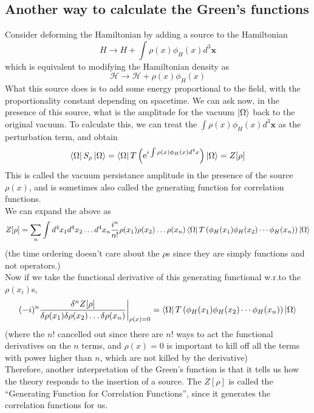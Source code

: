 \documentclass[11pt, notitlepage]{report}
\newcommand{\e}{\mathrm{e}}
\newcommand{\hd}{\mathcal{H}}
\numberwithin{equation}{section}
\begin{document}
\subsection{Another way to calculate the Green's functions}
Consider deforming the Hamiltonian by adding a source to the Hamiltonian 
\begin{equation*}
    H \to H + \int \rho(x) \phi_H(x) d^3\textbf{x}
\end{equation*}
which is equivalent to modifying the Hamiltonian density as 
\begin{equation*}
    \hd \to \hd + \rho(x) \phi_H(x)
\end{equation*}
What this source does is to add some energy proportional to the field, with the proportionality constant depending on spacetime. We can ask now, in the presence of this source, what is the amplitude for the vacuum \(\ket{\Omega}\) back to the original vacuum. To calculate this, we can treat the \(\int \rho(x)\phi_H(x)d^3\textbf{x}\) as the perturbation term, and obtain 
\begin{equation*}
    \bra{\Omega}S_\rho \ket{\Omega} = \bra{\Omega} T\left(\e^{i\int \rho(x)\phi_H(x)d^4x} \right) \ket{\Omega}  = Z[\rho]
\end{equation*}
This is called the vacuum persistance amplitude in the presence of the source \(\rho(x)\), and is sometimes also called the generating function for correlation functions.\\
We can expand the above as 
\begin{equation*}
    Z[\rho] = \sum_n \int d^4x_1 d^4x_2 \ldots d^4x_n \frac{i^n}{n!} \rho(x_1)\rho(x_2)\ldots\rho(x_n)\bra{\Omega} T\left(  \phi_H(x_1)\phi_H(x_2)\cdots \phi_H(x_n) \right) \ket{\Omega}
\end{equation*}
(the time ordering doesn't care about the \(\rho\)s since they are simply functions and not operators.)\\

Now if we take the functional derivative of this generating functional w.r.to the \(\rho(x_i)\)s, 
\begin{equation*}
    (-i)^n\frac{\delta^n Z[\rho]}{\delta \rho(x_1)\delta \rho(x_2) \ldots {\delta \rho(x_n)}} \bigg|_{\rho(x) = 0}= \bra{\Omega} T\left(  \phi_H(x_1)\phi_H(x_2)\cdots \phi_H(x_n) \right) \ket{\Omega}
\end{equation*}
(where the \(n!\) cancelled out since there are \(n!\) ways to act the functional derivatives on the \(n\) terms, and \(\rho(x)=0\) is important to kill off all the terms with power higher than \(n\), which are not killed by the derivative)\\

Therefore, another interpretation of the Green's function is that it tells us how the theory responds to the insertion of a source. The \(Z[\rho]\) is called the ``Generating Function for Correlation Functions'', since it generates the correlation functions for us.
\end{document}
